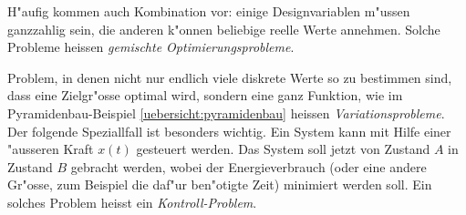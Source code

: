 H"aufig kommen auch Kombination vor: einige Designvariablen m"ussen
ganzzahlig sein, die anderen k"onnen beliebige reelle Werte annehmen.
Solche Probleme heissen {\em gemischte Optimierungsprobleme}.

Problem, in denen nicht nur endlich viele diskrete Werte so zu bestimmen
sind, dass eine Zielgr"osse optimal wird, sondern eine ganz Funktion,
wie im Pyramidenbau-Beispiel \ref{uebersicht:pyramidenbau} heissen
{\em Variationsprobleme}. Der folgende Speziallfall ist besonders wichtig.
Ein System kann mit Hilfe einer "ausseren Kraft $x(t)$ gesteuert werden.
Das System soll jetzt von Zustand $A$ in Zustand $B$ gebracht werden,
wobei der Energieverbrauch (oder eine andere Gr"osse, zum Beispiel die
daf"ur ben"otigte Zeit) minimiert werden soll. Ein solches Problem heisst
ein {\em Kontroll-Problem}.
